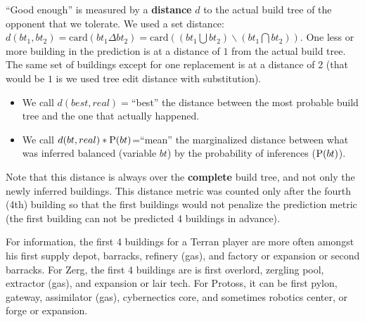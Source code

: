 ``Good enough'' is measured by a \textbf{distance} $d$ to the actual build tree of the opponent that we tolerate. We used a set distance: $d(bt_1, bt_2) = \mathrm{card}(bt_1 \Delta bt_2) = \mathrm{card}((bt_1\bigcup bt_2) \backslash (bt_1\bigcap bt_2))$. One less or more building in the prediction is at a distance of $1$ from the actual build tree. The same set of buildings except for one replacement is at a distance of $2$ (that would be $1$ is we used tree edit distance with substitution). 
\begin{itemize}
    \item We call $d(best,real)=$``best'' the distance between the most probable build tree and the one that actually happened.
    \item We call $d(bt,real)*\mathrm{P}(bt)$=``mean'' the marginalized distance between what was inferred balanced (variable $bt$) by the probability of inferences ($\mathrm{P}(bt)$). 
\end{itemize} 
Note that this distance is always over the \textbf{complete} build tree, and not only the newly inferred buildings. This distance metric was counted only after the fourth (4th) building so that the first buildings would not penalize the prediction metric (the first building can not be predicted 4 buildings in advance). 

For information, the first 4 buildings for a Terran player are more often amongst his first supply depot, barracks, refinery (gas), and factory or expansion or second barracks. For Zerg, the first 4 buildings are is first overlord, zergling pool, extractor (gas), and expansion or lair tech. For Protoss, it can be first pylon, gateway, assimilator (gas), cybernectics core, and sometimes robotics center, or forge or expansion.


